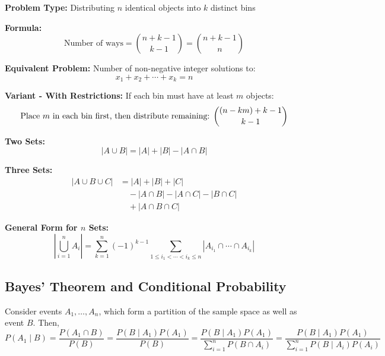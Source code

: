 \documentclass{article}
\begin{document}
\begin{tcolorbox}[title=Stars and Bars]
\textbf{Problem Type:} Distributing \( n \) identical objects into \( k \) distinct bins

\textbf{Formula:}
\[
\text{Number of ways} = \binom{n+k-1}{k-1} = \binom{n+k-1}{n}
\]

\textbf{Equivalent Problem:} Number of non-negative integer solutions to:
\[
x_1 + x_2 + \cdots + x_k = n
\]

\textbf{Variant - With Restrictions:} If each bin must have at least \( m \) objects:
\[
\text{Place \( m \) in each bin first, then distribute remaining: } \binom{(n-km)+k-1}{k-1}
\]
\end{tcolorbox}

\vspace{1em}

\begin{tcolorbox}[title=Inclusion-Exclusion Principle]
\textbf{Two Sets:}
\[
|A \cup B| = |A| + |B| - |A \cap B|
\]

\textbf{Three Sets:}
\[
\begin{aligned}
|A \cup B \cup C| &= |A| + |B| + |C| \\
&\quad - |A \cap B| - |A \cap C| - |B \cap C| \\
&\quad + |A \cap B \cap C|
\end{aligned}
\]

\textbf{General Form for \( n \) Sets:}
\[
\left|\bigcup_{i=1}^n A_i\right| = \sum_{k=1}^n (-1)^{k-1} \sum_{1 \leq i_1 < \cdots < i_k \leq n} \left|A_{i_1} \cap \cdots \cap A_{i_k}\right|
\]
\end{tcolorbox}




\subsection{Bayes' Theorem and Conditional Probability}
\begin{tcolorbox}[colback=white,colframe=black,title={Conditional Probability, Bayes, and Law of Total Probability}]
Consider events $A_1, \dots, A_n$, which form a partition of the sample space as well as event $B$. Then,
\[
P(A_1 \mid B) = \frac{P(A_1 \cap B)}{P(B)} 
= \frac{P(B \mid A_1) P(A_1)}{P(B)}
= \frac{P(B \mid A_1)P(A_1)}{\sum_{i=1}^n P(B \cap A_i)}
= \frac{P(B \mid A_1)P(A_1)}{\sum_{i=1}^n P(B \mid A_i)P(A_i)}
\]
\end{tcolorbox}
\end{document}
